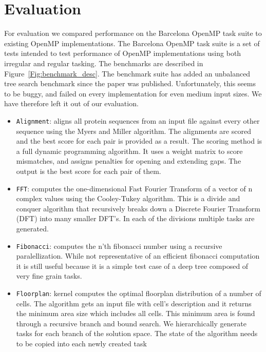 \documentclass[sigconf]{acmart}
\begin{document}
\section{Evaluation} \label{Sec:Evaluation}

For evaluation we compared performance on the Barcelona OpenMP task suite to 
existing OpenMP implementations. The Barcelona OpenMP task suite is a set of 
tests intended to test performance of OpenMP implementations using both
irregular and regular tasking. The benchmarks are described in
Figure~\ref{Fig:benchmark_desc}. The benchmark suite has added an unbalanced
tree search benchmark since the paper was published.  Unfortunately, this seems
to be buggy, and failed on every implementation for even medium input sizes. We
have therefore left it out of our evaluation.

\begin{itemize}
\item \texttt{Alignment}: aligns all protein sequences from  an  input
file  against  every  other  sequence  using  the Myers  and Miller \cite{}
algorithm. The alignments are scored and the best score for each pair is
provided as a result. The scoring method is  a  full  dynamic  programming
algorithm. It uses  a  weight matrix to score mismatches, and assigns
penalties for opening and extending gaps. The output is the best score for each
pair of them.
\item \texttt{FFT}: computes the one-dimensional Fast Fourier Transform
of a vector of n complex values using the Cooley-Tukey \cite{cooley-tukey}
algorithm. This is a divide and conquer algorithm that  recursively  breaks
down a Discrete Fourier Transform (DFT) into many smaller DFT’s. In each of the
divisions multiple tasks are generated.
\item \texttt{Fibonacci}: computes the n'th fibonacci number using a  recursive
paralellization. While  not  representative  of  an efficient  fibonacci
computation  it  is  still  useful  because  it  is a simple test case of a
deep tree composed of very fine grain tasks.  
\item \texttt{Floorplan}: kernel computes the optimal floorplan distribution
of a number of cells. The algorithm gets an input file with  cell’s
description  and  it  returns  the  minimum  area  size which includes all
cells. This minimum area is found through a recursive branch and bound search.
We hierarchically generate tasks  for  each  branch  of  the  solution  space.
The  state  of  the algorithm needs to be copied into each newly created task

\end{itemize}
\end{document}

